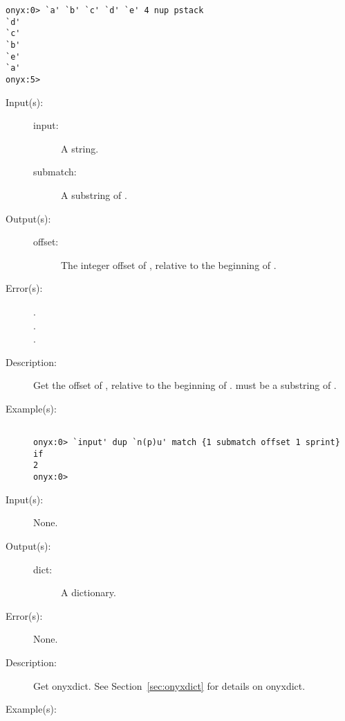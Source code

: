 \begin{description}
\begin{description}
\begin{verbatim}
onyx:0> `a' `b' `c' `d' `e' 4 nup pstack
`d'
`c'
`b'
`e'
`a'
onyx:5>
		\end{verbatim}
	\end{description}
\label{systemdict:offset}
\item[{\onyxop{input submatch}{offset}{offset}}: ]
	\begin{description}\item[]
	\item[Input(s): ]
		\begin{description}\item[]
		\item[input: ]
			A string.
		\item[submatch: ]
			A substring of .
		\end{description}
	\item[Output(s): ]
		\begin{description}\item[]
		\item[offset: ]
			The integer offset of , relative to the
			beginning of .
		\end{description}
	\item[Error(s): ]
		\begin{description}\item[]
		\item[.]
		\item[.]
		\item[.]
		\end{description}
	\item[Description: ]
		Get the offset of , relative to the beginning of
		.   must be a substring of
		.
	\item[Example(s): ]\begin{verbatim}

onyx:0> `input' dup `n(p)u' match {1 submatch offset 1 sprint} if
2
onyx:0>
		\end{verbatim}
	\end{description}
\label{systemdict:onyxdict}
\item[{\onyxop{--}{onyxdict}{dict}}: ]
	\begin{description}\item[]
	\item[Input(s): ] None.
	\item[Output(s): ]
		\begin{description}\item[]
		\item[dict: ]
			A dictionary.
		\end{description}
	\item[Error(s): ] None.
	\item[Description: ]
		Get onyxdict.  See Section~\ref{sec:onyxdict} for details on
		onyxdict.
	\item[Example(s): ]\begin{verbatim}


\end{verbatim}
\end{description}
\end{description}
